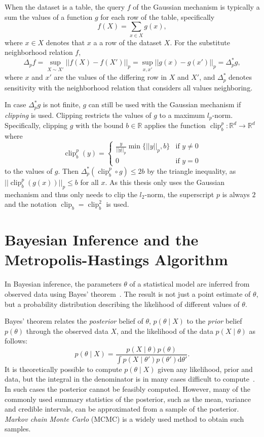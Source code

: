 \documentclass[english,twoside,openright]{HYgraduMLDS}
\newcommand{\R}{\mathbb{R}}
\newcommand{\dx}{\mathrm{d}}
\DeclareMathOperator{\clip}{clip}
\begin{document}
When the dataset is a table, the query \(f\) of the Gaussian mechanism is
typically a sum the values of a function \(g\) for each row of the table,
specifically
\[
  f(X) = \sum_{x\in X} g(x),
\]
where \(x\in X\) denotes that \(x\) a a row of the dataset \(X\).
For the substitute neighborhood relation \(f\),
\[
  \Delta_{p}f = \sup_{X\sim X'}||f(X) - f(X')||_{p}
  = \sup_{x, x'}||g(x) - g(x')||_{p}
  = \Delta^{*}_{p}g,
\]
where \(x\) and \(x'\) are the values of the differing row in \(X\) and \(X'\),
and \(\Delta^{*}_{p}\) denotes sensitivity with the neighborhood relation that
considers all values neighboring.

In case \(\Delta^{*}_{p}g\) is not finite, \(g\) can still be used with
the Gaussian mechanism if \emph{clipping} is used. Clipping restricts the
values of \(g\) to a maximum \(l_{p}\)-norm. Specifically, clipping
\(g\) with the bound \(b\in \R\) applies
the function \(\clip_{b}^{p}\colon \R^{d}\to \R^{d}\) where
\[
  \clip_{b}^{p}(y) =
  \begin{cases}
    \frac{y}{||y||_{p}}\min\{||y||_{p}, b\} & \text{if } y \neq 0\\
    0 & \text{if } y = 0
  \end{cases}
\]
to the values of \(g\). Then \(\Delta^{*}_{p}(\clip_{b}^{p} \circ g) \leq 2b\) by the
triangle inequality, as \(||\clip_{b}^{p}(g(x))||_{p} \leq b\) for
all \(x\). As this thesis only uses the Gaussian mechanism and
thus only needs to clip the \(l_{2}\)-norm, the superscript \(p\) is always
\(2\) and the notation \(\clip_{b} = \clip_{b}^{2}\) is used.

\section{Bayesian Inference and the Metropolis-Hastings Algorithm}\label{MCMC_background}

In Bayesian inference, the parameters \(\theta\) of a statistical model are
inferred from 
observed data using Bayes' theorem~\cite{BDA}. The result is not just a point estimate 
of \(\theta\), but a probability distribution describing the likelihood
of different values of \(\theta\).

Bayes' theorem relates the \emph{posterior} belief of \(\theta\),
\(p(\theta \mid X)\) to the \emph{prior} belief \(p(\theta)\) through the 
observed data \(X\), and the likelihood of the data \(p(X\mid \theta)\) as follows:
\[
    p(\theta \mid X) = \frac{p(X \mid \theta)p(\theta)}
    {\int p(X\mid \theta')p(\theta')\dx\theta'}.
\]
It is theoretically possible to compute \(p(\theta \mid X)\) given any 
likelihood, prior and data, but the integral in the denominator is in many 
cases difficult to compute~\cite{BDA}. In such cases the posterior cannot be feasibly 
computed. However, many of the commonly used summary statistics of the posterior, 
such as the mean, variance and credible intervals, can be approximated from 
a sample of the posterior. \emph{Markov chain Monte Carlo}
(MCMC) is a widely used method to obtain such samples.
\end{document}
